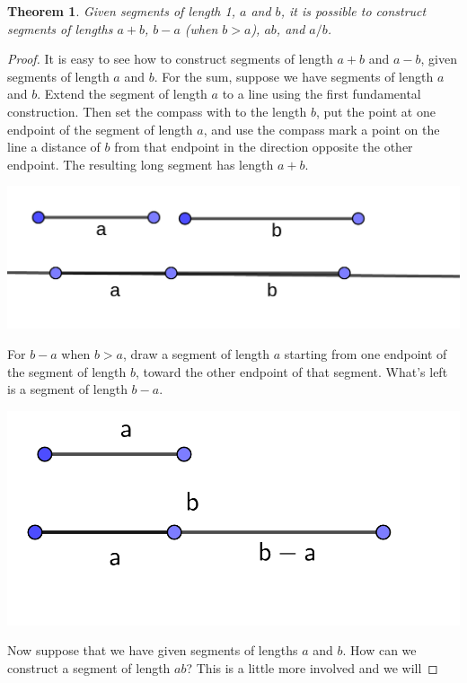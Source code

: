 \documentclass[11pt]{article}
\newtheorem{theorem}{Theorem}[section]
\theoremstyle{definition}
\begin{document}
\begin{theorem}
  Given segments of length 1, $a$ and $b$, it is possible to construct segments of lengths $a+b$, $b-a$ (when $b>a$), $ab$, and $a/b$.
  \label{theorem: rational constructions}
\end{theorem}
\begin{proof}
  It is easy to see how to construct segments of length $a+b$ and $a-b$, given segments of length $a$ and $b$. For the sum, suppose we have segments of 
  length $a$ and $b$. Extend the segment of length $a$ to a line using the first fundamental construction. Then set the compass with to the length $b$,
  put the point at one endpoint of the segment of length $a$, and use the compass mark a point on the line a distance of $b$ from that endpoint in the direction
  opposite the other endpoint. The resulting long segment has length $a+b$.
  \begin{center}
    \includegraphics[scale=.1]{Images/a_plus_b.png}
  \end{center}
  For $b-a$ when $b>a$, draw a segment of length $a$ starting from one endpoint of the segment of length $b$, toward the other endpoint of that 
  segment. What's left is a segment of length $b-a$.
  \begin{center}
    \includegraphics[scale=.1]{Images/b_minus_a.png}
  \end{center}
  Now suppose that we have given segments of lengths $a$ and $b$. How can we construct a segment of length $ab$? This is a little more involved and we will

\end{proof}
\end{document}
